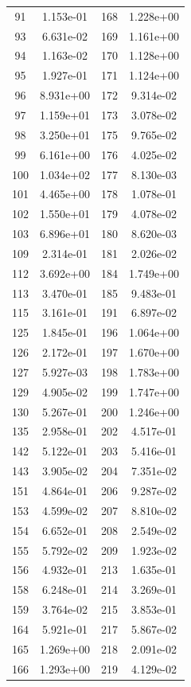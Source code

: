 \documentclass[12pt]{article}
\begin{document}
\begin{longtable}{@{}cccc@{}}
91 & 1.153e-01 & 168 & 1.228e+00 \\
93 & 6.631e-02 & 169 & 1.161e+00 \\
94 & 1.163e-02 & 170 & 1.128e+00 \\
95 & 1.927e-01 & 171 & 1.124e+00 \\
96 & 8.931e+00 & 172 & 9.314e-02 \\
97 & 1.159e+01 & 173 & 3.078e-02 \\
98 & 3.250e+01 & 175 & 9.765e-02 \\
99 & 6.161e+00 & 176 & 4.025e-02 \\
100 & 1.034e+02 & 177 & 8.130e-03 \\
101 & 4.465e+00 & 178 & 1.078e-01 \\
102 & 1.550e+01 & 179 & 4.078e-02 \\
103 & 6.896e+01 & 180 & 8.620e-03 \\
109 & 2.314e-01 & 181 & 2.026e-02 \\
112 & 3.692e+00 & 184 & 1.749e+00 \\
113 & 3.470e-01 & 185 & 9.483e-01 \\
115 & 3.161e-01 & 191 & 6.897e-02 \\
125 & 1.845e-01 & 196 & 1.064e+00 \\
126 & 2.172e-01 & 197 & 1.670e+00 \\
127 & 5.927e-03 & 198 & 1.783e+00 \\
129 & 4.905e-02 & 199 & 1.747e+00 \\
130 & 5.267e-01 & 200 & 1.246e+00 \\
135 & 2.958e-01 & 202 & 4.517e-01 \\
142 & 5.122e-01 & 203 & 5.416e-01 \\
143 & 3.905e-02 & 204 & 7.351e-02 \\
151 & 4.864e-01 & 206 & 9.287e-02 \\
153 & 4.599e-02 & 207 & 8.810e-02 \\
154 & 6.652e-01 & 208 & 2.549e-02 \\
155 & 5.792e-02 & 209 & 1.923e-02 \\
156 & 4.932e-01 & 213 & 1.635e-01 \\
158 & 6.248e-01 & 214 & 3.269e-01 \\
159 & 3.764e-02 & 215 & 3.853e-01 \\
164 & 5.921e-01 & 217 & 5.867e-02 \\
165 & 1.269e+00 & 218 & 2.091e-02 \\
166 & 1.293e+00 & 219 & 4.129e-02 \\

\end{longtable}
\end{document}
